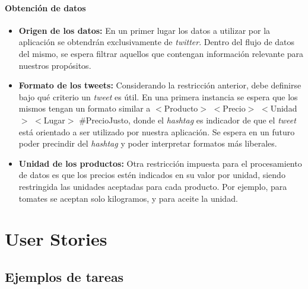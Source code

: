 \documentclass[10pt, a4paper]{article}
\newcommand{\userStory}[8]{
	\fbox{
	\begin{minipage}{0.9\textwidth}

		\vspace{0.1cm}

		\begin{large}\textbf{#1: \textit{#2}}		\end{large}

		\vspace{11pt}

		\textbf{Descripción:} #3

		\vspace{9pt}

		\textbf{Criterios de aceptación:} #4

		\vspace{9pt}

		\begin{tabular}{ l c l }
		\textbf{Responsable:} #5 & \hspace{0.2\textwidth} & \textbf{Story Points:} #6 \\[6pt]
		\textbf{Iteración:} #7 & \hspace{0.2\textwidth} & \textbf{Estado:} #8 \\
		\end{tabular}

		\vspace{2pt}

	\end{minipage}
	}
}
\newcommand{\task}[7]{
	\fbox{
	\begin{minipage}{0.9\textwidth}

		\vspace{0.1cm}

		\begin{large}\textbf{#1: }\textit{#2}		\end{large}

		\vspace{5pt}

		\textbf{Descripción:} #3

		\vspace{3pt}

		\begin{tabular}{ l c l }
		\textbf{Horas estimadas:} #4 & \hspace{0.2\textwidth} & \textbf{Responsable:} #5 \\[1pt]
		\textbf{Horas faltantes:} #6 & \hspace{0.2\textwidth} & \textbf{Estado:} #7 \\
		\end{tabular}

		\vspace{2pt}

	\end{minipage}
	}
}
\begin{document}
\paragraph{Obtención de datos}
\begin{itemize}
    \item \textbf{Origen de los datos:} En un primer lugar los datos a utilizar por la aplicación se obtendrán exclusivamente de \emph{twitter}. Dentro del flujo de datos del mismo, se espera filtrar aquellos que contengan información relevante para nuestros propósitos.
    \item \textbf{Formato de los tweets:} Considerando la restricción anterior, debe definirse bajo qué criterio un \emph{tweet} es útil. En una primera instancia se espera que los mismos tengan un formato similar a \textsf{$<$Producto$>$ $<$Precio$>$ $<$Unidad$>$ $<$Lugar$>$ \#PrecioJusto}, donde el \emph{hashtag} es indicador de que el \emph{tweet} está orientado a ser utilizado por nuestra aplicación. Se espera en un futuro poder precindir del \emph{hashtag} y poder interpretar formatos más liberales.
    \item \textbf{Unidad de los productos:} Otra restricción impuesta para el procesamiento de datos es que los precios estén indicados en su valor por unidad, siendo restringida las unidades aceptadas para cada producto. Por ejemplo, para tomates se aceptan solo kilogramos, y para aceite la unidad.
\end{itemize}

\section{User Stories}




\newpage

\subsection{Ejemplos de tareas}
\end{document}
